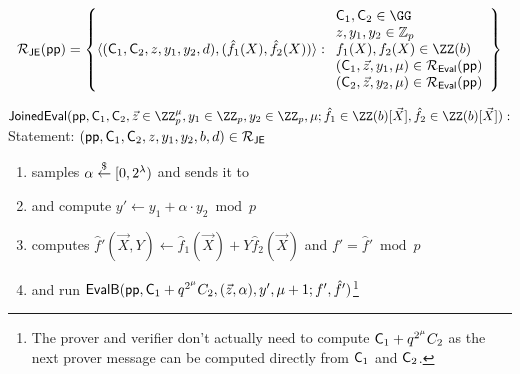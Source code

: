 \[
\mathcal{R_\textsf{JE}}(\params) = \left\lbrace
\langle (\gr{C}_1,\gr{C}_2, z, y_1,y_2,d), (\hat{f}_1(X), \hat{f}_2(X)) \rangle
: \\
\begin{array}{l} 
\gr{C}_1, \gr{C}_2 \in \GG \\
z, y_1, y_2 \in \mathbb{Z}_p \\
f_1(X), f_2(X) \in \ZZ(b) \\
(\gr{C}_1,\vec{z},y_1,\mu) \in \mathcal{R_\textsf{Eval}}(\params) \\
(\gr{C}_2,\vec{z},y_2,\mu) \in \mathcal{R_\textsf{Eval}}(\params)
\end{array}
\right\rbrace
\]





\begin{mdframed}
	$\pro{JoinedEval}(\crs, \gr{C}_1, \gr{C}_2, \vec{z} \in \ZZ_p^\mu, y_1 \in \ZZ_p, y_2 \in \ZZ_p, \mu; \hat{f}_1 \in \ZZ(b)[\vec{X}] ,\hat{f}_2 \in \ZZ(b)[\vec{X}]) :$  \\
Statement: $(\crs,\gr{C}_1,\gr{C}_2,z,y_1,y_2,b,d)\in \mathcal{R}_{\pro{JE}}$
			\begin{enumerate}[nolistsep]
        \item \verifier samples $\alpha \overset{\$}{\gets} [0,2^\lambda)$ and sends it to \prover
			\item \prover and \verifier compute $y'\gets  y_1 + \alpha \cdot y_2 \bmod p$
			\item \prover computes $\hat{f}'(\vec{X},Y)\gets \hat{f}_1(\vec{X}) +Y  \hat{f}_2(\vec{X})$ and $f'=\hat{f}' \bmod p$
			\item \prover and \verifier run $\pro{EvalB}(\params,\gr{C}_1+q^{2^{\mu}}C_2,(\vec{z},\alpha),y',\mu+1;f',\hat{f}')$\footnote{The prover and verifier don't actually need to compute $\gr{C}_1+q^{2^{\mu}}C_2$ as the next prover message can be computed directly from $\gr{C}_1$ and $\gr{C}_2$.}
		    \end{enumerate}
\end{mdframed}


